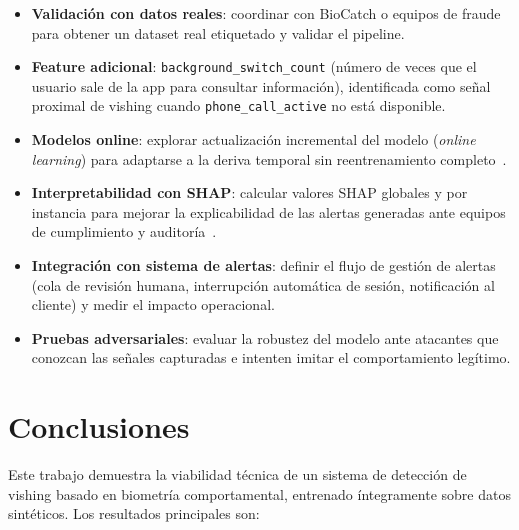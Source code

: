 \documentclass[journal]{IEEEtran}
\begin{document}
\begin{itemize}
    \item \textbf{Validación con datos reales}: coordinar con BioCatch o
    equipos de fraude para obtener un dataset real etiquetado y validar el
    pipeline.

    \item \textbf{Feature adicional}: \texttt{background\_switch\_count}
    (número de veces que el usuario sale de la app para consultar información),
    identificada como señal proximal de vishing cuando \texttt{phone\_call\_active}
    no está disponible.

    \item \textbf{Modelos online}: explorar actualización incremental del modelo
    (\textit{online learning}) para adaptarse a la deriva temporal sin reentrenamiento
    completo~\cite{lu2020concept}.

    \item \textbf{Interpretabilidad con SHAP}: calcular valores SHAP globales
    y por instancia para mejorar la explicabilidad de las alertas generadas
    ante equipos de cumplimiento y auditoría~\cite{lundberg2017shap}.

    \item \textbf{Integración con sistema de alertas}: definir el flujo de
    gestión de alertas (cola de revisión humana, interrupción automática de
    sesión, notificación al cliente) y medir el impacto operacional.

    \item \textbf{Pruebas adversariales}: evaluar la robustez del modelo ante
    atacantes que conozcan las señales capturadas e intenten imitar el
    comportamiento legítimo.
\end{itemize}

\section{Conclusiones}
\label{sec:conclusiones}

Este trabajo demuestra la viabilidad técnica de un sistema de detección de
vishing basado en biometría comportamental, entrenado íntegramente sobre datos
sintéticos. Los resultados principales son:
\end{document}

